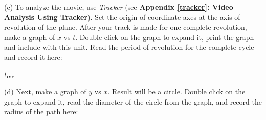 %
%
(c) To analyze the movie, use \textit{Tracker} (see \textbf{Appendix \ref{tracker}: Video Analysis Using Tracker}). 
Set the origin of coordinate axes at the axis of revolution of the plane.  After your track is made for one complete revolution, make a graph of $x$ vs $t$. Double click on the graph to expand it, print the graph and include with this unit. Read the period of revolution for the complete cycle and record it here:
\vspace{5mm}

\hspace{0.5in} \( t_{\rm rev} \) = 
\vspace{5mm}


%
(d) Next, make a graph of $y$ vs $x$.  Result will be a circle. Double click on the graph to expand it, read the diameter of the circle from the graph, and record the radius of the path here:
\vspace{5mm}

